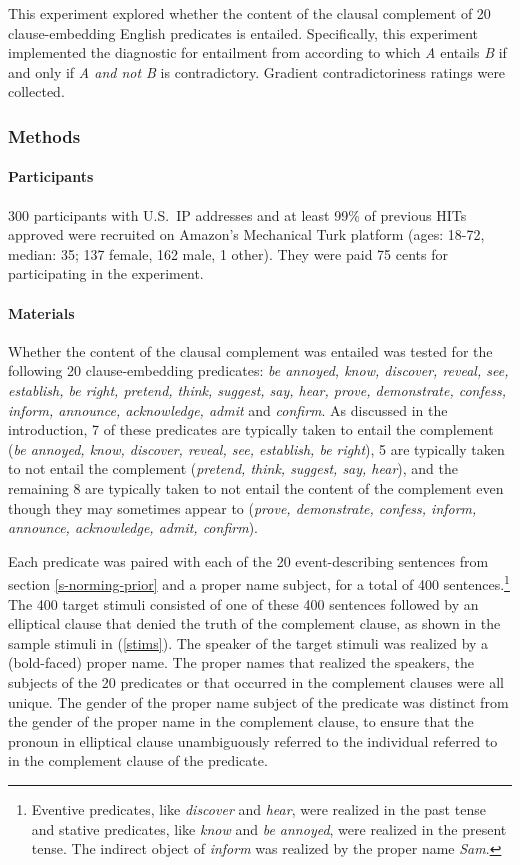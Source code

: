 \documentclass[11pt,fleqn]{article}
\newcommand{\6}{\mbox{$[\hspace*{-.6mm}[$}}
\newcommand{\9}{\mbox{$]\hspace*{-.6mm}]$}}
\begin{document}
This experiment explored whether the content of the clausal complement of 20 clause-embedding English predicates is entailed. Specifically, this experiment implemented the diagnostic for entailment from \citealt{ccmg90} according to which {\em A} entails {\em B} if and only if {\em A and not B} is contradictory. Gradient contradictoriness ratings were collected.

\subsubsection{Methods}\label{s-methods-2}

\paragraph{Participants} 300 participants with U.S.\ IP addresses and at least 99\% of previous HITs approved were recruited on Amazon's Mechanical Turk platform (ages: 18-72, median: 35; 137 female, 162 male, 1 other). They were paid 75 cents for participating in the experiment.

\paragraph{Materials} Whether the content of the clausal complement was entailed was tested for the following 20 clause-embedding predicates: {\em be annoyed, know, discover, reveal, see, establish, be right, pretend, think, suggest, say, hear, prove, demonstrate, confess, inform, announce, acknowledge, admit} and {\em confirm}. As discussed in the introduction, 7 of these predicates are typically taken to entail the complement ({\em be annoyed, know, discover, reveal, see, establish, be right}), 5 are typically taken to not entail the complement ({\em pretend, think, suggest, say, hear}), and the remaining 8 are typically taken to not entail the content of the complement even though they may sometimes appear to ({\em prove, demonstrate, confess, inform, announce, acknowledge, admit, confirm}).

Each predicate was paired with each of the 20 event-describing sentences from section \ref{s-norming-prior} and a proper name subject, for a total of 400 sentences.\footnote{Eventive predicates, like {\em discover} and {\em hear}, were realized in the past tense and stative predicates, like {\em know} and {\em be annoyed}, were realized in the present tense. The indirect object of {\em inform} was realized by the proper name {\em Sam}.} The 400 target stimuli consisted of one of these 400 sentences followed by an elliptical clause that denied the truth of the complement clause, as shown in the sample stimuli in (\ref{stims}). The speaker of the target stimuli was realized by a (bold-faced) proper name. The proper names that realized the speakers, the subjects of the 20 predicates or that occurred in the complement clauses were all unique. The gender of the proper name subject of the predicate was distinct from the gender of the proper name in the complement clause, to ensure that the pronoun in elliptical clause unambiguously referred to the individual referred to in the complement clause of the predicate.
\end{document}
